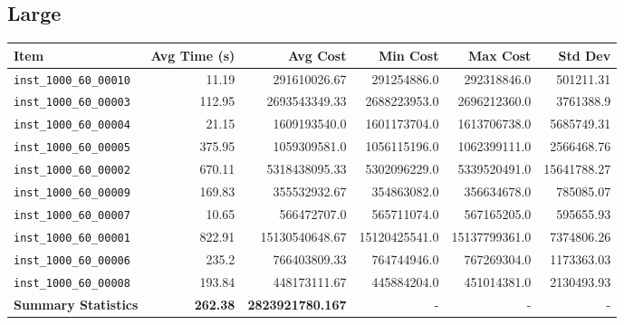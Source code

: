 \documentclass{article}
\begin{document}
\subsection*{Large}
\begin{table}[H]
	\centering
	\begin{tabular}{lrrrrr}
		\toprule
		\textbf{Item} & \textbf{Avg Time (s)} & \textbf{Avg Cost} & \textbf{Min Cost} & \textbf{Max Cost} & \textbf{Std Dev} \\
		\midrule
		\texttt{inst\_1000\_60\_00010} & 11.19 & 291610026.67 & 291254886.0 & 292318846.0 & 501211.31 \\ 
		\texttt{inst\_1000\_60\_00003} & 112.95 & 2693543349.33 & 2688223953.0 & 2696212360.0 & 3761388.9 \\ 
		\texttt{inst\_1000\_60\_00004} & 21.15 & 1609193540.0 & 1601173704.0 & 1613706738.0 & 5685749.31 \\ \texttt{inst\_1000\_60\_00005} & 375.95 & 1059309581.0 & 1056115196.0 & 1062399111.0 & 2566468.76 \\ 
		\texttt{inst\_1000\_60\_00002} & 670.11 & 5318438095.33 & 5302096229.0 & 5339520491.0 & 15641788.27 \\ 
		\texttt{inst\_1000\_60\_00009} & 169.83 & 355532932.67 & 354863082.0 & 356634678.0 & 785085.07 \\ \texttt{inst\_1000\_60\_00007} & 10.65 & 566472707.0 & 565711074.0 & 567165205.0 & 595655.93 \\ 
		\texttt{inst\_1000\_60\_00001} & 822.91 & 15130540648.67 & 15120425541.0 & 15137799361.0 & 7374806.26 \\ \texttt{inst\_1000\_60\_00006} & 235.2 & 766403809.33 & 764744946.0 & 767269304.0 & 1173363.03 \\ 
		\texttt{inst\_1000\_60\_00008} & 193.84 & 448173111.67 & 445884204.0 & 451014381.0 & 2130493.93 \\
		\midrule
		\textbf{Summary Statistics} & \textbf{262.38} & \textbf{2823921780.167} & - & - & - \\
		\bottomrule
	\end{tabular}
	\label{tab:large_performance_metrics_gvns}
\end{table}
\end{document}
